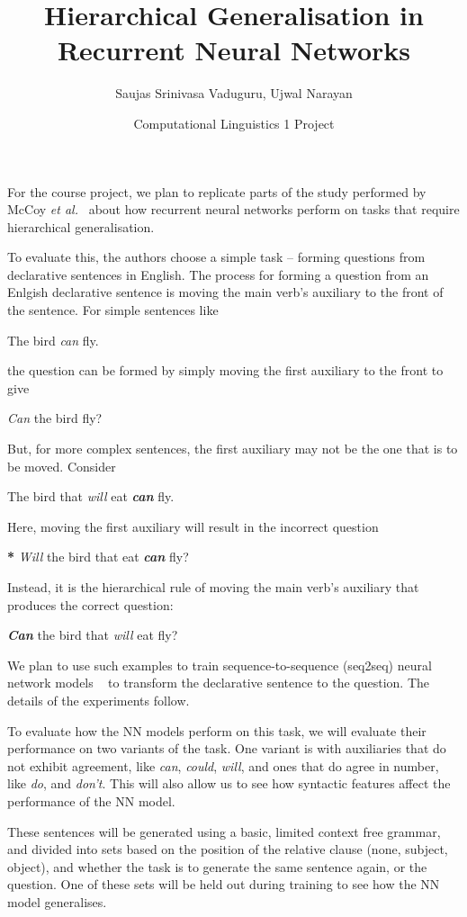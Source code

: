 \documentclass[11pt]{article}
\title{Hierarchical Generalisation in Recurrent Neural Networks}
\author{Saujas Srinivasa Vaduguru, Ujwal Narayan}
\date{Computational Linguistics 1 Project}
\newcommand{\etal}{\textit{et al.}}
\begin{document}
\maketitle
For the course project, we plan to replicate parts of the study performed by McCoy \etal ~\cite{McCoy} about how recurrent neural networks perform on tasks that require hierarchical generalisation.

To evaluate this, the authors choose a simple task -- forming questions from declarative sentences in English. The process for forming a question from an Enlgish declarative sentence is moving the main verb's auxiliary to the front of the sentence. For simple sentences like
\begin{center}
  The bird \textit{can} fly.
\end{center}
the question can be formed by simply moving the first auxiliary to the front to give
\begin{center}
  \textit{Can} the bird fly?
\end{center}
But, for more complex sentences, the first auxiliary may not be the one that is to be moved. Consider
\begin{center}
  The bird that \textit{will} eat \textit{\textbf{can}} fly.
\end{center}
Here, moving the first auxiliary will result in the incorrect question
\begin{center}
  \textbf{*} \textit{Will} the bird that eat \textit{\textbf{can}} fly?
\end{center}
Instead, it is the hierarchical rule of moving the main verb's auxiliary that produces the correct question:
\begin{center}
  \textit{\textbf{Can}} the bird that \textit{will} eat fly?
\end{center}

We plan to use such examples to train sequence-to-sequence (seq2seq) neural network models ~\cite{SutskeverVL14} to transform the declarative sentence to the question. The details of the experiments follow.

To evaluate how the NN models perform on this task, we will evaluate their performance on two variants of the task. One variant is with auxiliaries that do not exhibit agreement, like \textit{can}, \textit{could}, \textit{will}, and ones that do agree in number, like \textit{do}, and \textit{don't}. This will also allow us to see how syntactic features affect the performance of the NN model.

These sentences will be generated using a basic, limited context free grammar, and divided into sets based on the position of the relative clause (none, subject, object), and whether the task is to generate the same sentence again, or the question. One of these sets will be held out during training to see how the NN model generalises.
\end{document}
